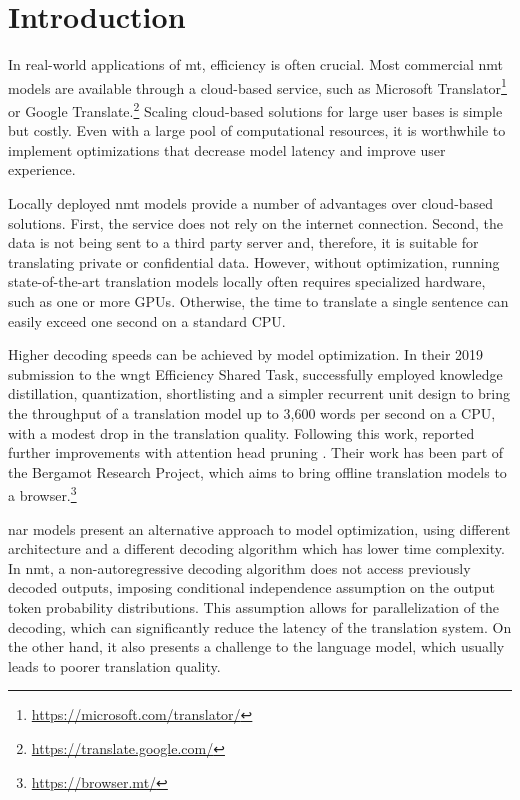 \chapter{Introduction}

In real-world applications of \ac{mt}, efficiency is often crucial.  Most
commercial \ac{nmt} models are available through a cloud-based service, such as
Microsoft Translator\footnote{\url{https://microsoft.com/translator/}} or
Google Translate.\footnote{\url{https://translate.google.com/}} Scaling
cloud-based solutions for large user bases is simple but costly. Even with a
large pool of computational resources, it is worthwhile to implement
optimizations that decrease model latency and improve user experience.

Locally deployed \ac{nmt} models provide a number of advantages over
cloud-based solutions. First, the service does not rely on the internet
connection. Second, the data is not being sent to a third party server and,
therefore, it is suitable for translating private or confidential data.
However, without optimization, running state-of-the-art translation models
locally often requires specialized hardware, such as one or more
GPUs. Otherwise, the time to translate a single sentence can easily exceed one
second on a standard CPU.

Higher decoding speeds can be achieved by model optimization. In their 2019
submission to the \ac{wngt} Efficiency Shared Task,
\citet{kim-etal-2019-research} successfully employed knowledge distillation,
quantization, shortlisting \citep{jean-etal-2015-using} and a simpler recurrent
unit design to bring the throughput of a translation model up to 3,600 words
per second on a CPU, with a modest drop in the translation quality. Following
this work, \citet{bogoychev-etal-2020-edinburghs} reported further improvements
with attention head pruning \citep{voita-etal-2019-analyzing}. Their work has
been part of the Bergamot Research Project, which aims to bring offline
translation models to a browser.\footnote{\url{https://browser.mt/}}

\Ac{nar} models present an alternative approach to model optimization, using
different architecture and a different decoding algorithm which has lower time
complexity.  In \ac{nmt}, a non-autoregressive decoding algorithm does not
access previously decoded outputs, imposing conditional independence assumption
on the output token probability distributions. This assumption allows for
parallelization of the decoding, which can significantly reduce the latency of
the translation system. On the other hand, it also presents a challenge to the
language model, which usually leads to poorer translation quality.




